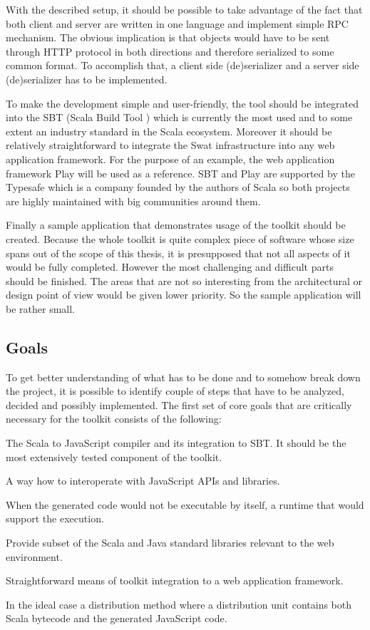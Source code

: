\documentclass[12pt,a4paper]{report}
\begin{document}
With the described setup, it should be possible to take advantage of the fact that both client and server are written in one language and implement simple RPC mechanism. The obvious implication is that objects would have to be sent through HTTP protocol in both directions and therefore serialized to some common format. To accomplish that, a client side (de)serializer and a server side (de)serializer has to be implemented.

To make the development simple and user-friendly, the tool should be integrated into the SBT (Scala Build Tool \cite{Sbt}) which is currently the most used and to some extent an industry standard in the Scala ecosystem. Moreover it should be relatively straightforward to integrate the Swat infrastructure into any web application framework. For the purpose of an example, the web application framework Play \cite{Play} will be used as a reference. SBT and Play are supported by the Typesafe \cite{Typesafe} which is a company founded by the authors of Scala so both projects are highly maintained with big communities around them.

Finally a sample application that demonstrates usage of the toolkit should be created. Because the whole toolkit is quite complex piece of software whose size spans out of the scope of this thesis, it is presupposed that not all aspects of it would be fully completed. However the most challenging and difficult parts should be finished. The areas that are not so interesting from the architectural or design point of view would be given lower priority. So the sample application will be rather small.

\subsection{Goals}

To get better understanding of what has to be done and to somehow break down the project, it is possible to identify couple of steps that have to be analyzed, decided and possibly implemented. The first set of core goals that are critically necessary for the toolkit consists of the following:

\begin{description}[style=multiline,leftmargin=5cm]
\item[1 - Compiler] The Scala to JavaScript compiler and its integration to SBT. It should be the most extensively tested component of the toolkit.
\item[2 - Interoperability] A way how to interoperate with JavaScript APIs and libraries.
\item[3 - Runtime] When the generated code would not be executable by itself, a runtime that would support the execution.
\item[4 - Libraries] Provide subset of the Scala and Java standard libraries relevant to the web environment.
\item[5 - Integration] Straightforward means of toolkit integration to a web application framework.
\item[6 - Distribution] In the ideal case a distribution method where a distribution unit contains both Scala bytecode and the generated JavaScript code.
\end{description}
\end{document}
